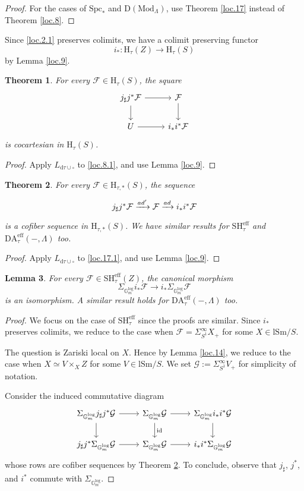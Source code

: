 \documentclass[10pt]{amsart}
\newtheorem{thm}{Theorem}[subsection]
\newtheorem{lem}[thm]{Lemma}
\theoremstyle{definition}
\theoremstyle{remark}
\numberwithin{equation}{subsection}
\newcommand{\cF}{\mathcal{F}}
\newcommand{\cG}{\mathcal{G}}
\newcommand{\rH}{\mathrm{H}}
\newcommand{\id}{\mathrm{id}}
\newcommand{\eff}{{\mathrm{eff}}}
\newcommand{\boxx}{\square}
\newcommand{\SH}{\mathrm{SH}}
\newcommand{\DLambda}{\mathrm{D}(\mathrm{Mod}_{\Lambda})}
\newcommand{\DA}{\mathrm{DA}}
\newcommand{\lSm}{\mathrm{lSm}}
\newcommand{\Spc}{\mathrm{Spc}}
\newcommand{\Gmm}{\mathbb{G}_m^{\mathrm{log}}}
\newcommand{\dtau}{\mathrm{d}\tau}
\begin{document}
\begin{proof}
For the cases of $\Spc_*$ and $\DLambda$, use Theorem \ref{loc.17} instead of Theorem \ref{loc.8}.
\end{proof}

Since \eqref{loc.2.1} preserves colimits, we have a colimit preserving functor
\begin{equation}
\label{loc.9.3}
i_*\colon \rH_{\tau}(Z)\to \rH_{\tau}(S)
\end{equation}
by Lemma \ref{loc.9}.

\begin{thm}
\label{loc.10}
For every  $\cF\in \rH_{\tau}(S)$, the square
\[
\begin{tikzcd}
j_\sharp j^*\cF\ar[d]\ar[r]&
\cF\ar[d]
\\
U\ar[r]&
i_*i^*\cF
\end{tikzcd}
\]
is cocartesian in $\rH_{\tau}(S)$.
\end{thm}
\begin{proof}
Apply $L_{\dtau\cup\boxx}$ to \eqref{loc.8.1}, and use Lemma \ref{loc.9}.
\end{proof}

\begin{thm}
\label{loc.11}
For every $\cF\in \rH_{\tau,*}(S)$, the sequence
\[
\begin{tikzcd}
j_\sharp j^* \cF
\xrightarrow{ad'}
\cF
\xrightarrow{ad}
i_*i^*\cF
\end{tikzcd}
\]
is a cofiber sequence in $\rH_{\tau,*}(S)$.
We have similar results for $\SH_{\tau}^\eff$ and $\DA_{\tau}^\eff(-,\Lambda)$ too.
\end{thm}
\begin{proof}
Apply $L_{\dtau\cup\boxx}$ to \eqref{loc.17.1}, and use Lemma \ref{loc.9}.
\end{proof}

\begin{lem}
\label{loc.18}
For every $\cF\in \SH_{\tau}^\eff(Z)$, the canonical morphism
\[
\Sigma_{\Gmm}i_*\cF
\to
i_*\Sigma_{\Gmm}\cF
\]
is an isomorphism.
A similar result holds for $\DA^\eff_{\tau}(-,\Lambda)$ too.
\end{lem}
\begin{proof}
We focus on the case of $\SH_{\tau}^\eff$ since the proofs are similar.
Since $i_*$ preserves colimits,
we reduce to the case when $\cF=\Sigma_{S^1}^\infty X_+$ for some $X\in \lSm/S$.

The question is Zariski local on $X$.
Hence by Lemma \ref{loc.14}, we reduce to the case when $X\simeq V\times_X Z$ for some $V\in \lSm/S$.
We set $\cG:=\Sigma_{S^1}^\infty V_+$ for simplicity of notation.

Consider the induced commutative diagram
\[
\begin{tikzcd}
\Sigma_{\Gmm}j_\sharp j^* \cG\ar[d]\ar[r]&
\Sigma_{\Gmm}\cG\ar[d,"\id"]\ar[r]&
\Sigma_{\Gmm}i_*i^*\cG\ar[d]
\\
j_\sharp j^* \Sigma_{\Gmm}\cG\ar[r]&
\Sigma_{\Gmm}\cG\ar[r]&
i_*i^*\Sigma_{\Gmm}\cG
\end{tikzcd}
\]
whose rows are cofiber sequences by Theorem \ref{loc.11}.
To conclude, observe that $j_\sharp$, $j^*$, and $i^*$ commute with $\Sigma_{\Gmm}$.
\end{proof}
\end{document}
